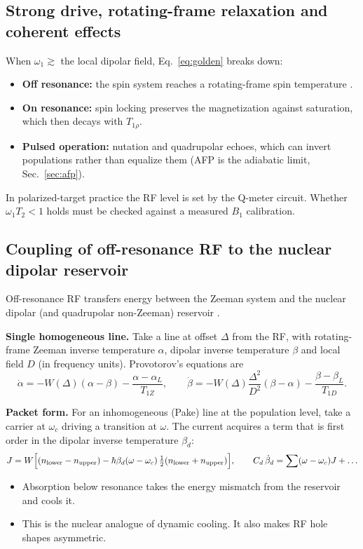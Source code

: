 \documentclass[11pt]{article}
\begin{document}
\subsection{Strong drive, rotating-frame relaxation and coherent effects}
When $\omega_1\gtrsim$ the local dipolar field, Eq.~\eqref{eq:golden} breaks down:
\begin{itemize}
\item \textbf{Off resonance:} the spin system reaches a rotating-frame spin temperature
\cite{Redfield1955,Goldman1970}.
\item \textbf{On resonance:} spin locking preserves the magnetization against saturation,
which then decays with $T_{1\rho}$.
\item \textbf{Pulsed operation:} nutation and quadrupolar echoes, which can invert populations
rather than equalize them (AFP is the adiabatic limit, Sec.~\ref{sec:afp}).
\end{itemize}
In polarized-target practice the RF level is set by the Q-meter circuit. Whether
$\omega_1T_2<1$ holds must be checked against a measured $B_1$ calibration.

\subsection{Coupling of off-resonance RF to the nuclear dipolar reservoir}
\label{sec:provotorov}
Off-resonance RF transfers energy between the Zeeman system and the nuclear dipolar (and
quadrupolar non-Zeeman) reservoir \cite{Provotorov1962,Goldman1970}.

\textbf{Single homogeneous line.} Take a line at offset $\Delta$ from the RF, with
rotating-frame Zeeman inverse temperature $\alpha$, dipolar inverse temperature $\beta$ and
local field $D$ (in frequency units). Provotorov's equations are
\begin{equation}
\dot\alpha=-W(\Delta)(\alpha-\beta)-\frac{\alpha-\alpha_L}{T_{1Z}},\qquad
\dot\beta=-W(\Delta)\frac{\Delta^2}{D^2}(\beta-\alpha)-\frac{\beta-\beta_L}{T_{1D}} .
\label{eq:provotorov}
\end{equation}

\textbf{Packet form.} For an inhomogeneous (Pake) line at the population level, take a carrier
at $\omega_c$ driving a transition at $\omega$. The current acquires a term that is first
order in the dipolar inverse temperature $\beta_d$:
\begin{equation}
J=W\Big[(n_{\rm lower}-n_{\rm upper})-\hbar\beta_d(\omega-\omega_c)\,\tfrac12(n_{\rm lower}+n_{\rm upper})\Big],
\qquad
C_d\,\dot\beta_d=\sum(\omega-\omega_c)J+\dots
\label{eq:rfdipolar}
\end{equation}
\begin{itemize}
\item Absorption below resonance takes the energy mismatch from the reservoir and cools it.
\item This is the nuclear analogue of dynamic cooling. It also makes RF hole shapes
asymmetric.
\end{itemize}
\end{document}
